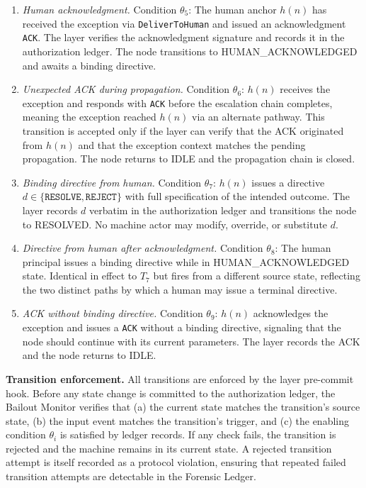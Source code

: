 \begin{enumerate}
\item[$T_5$ (ESCALATING $\rightarrow$ HUMAN\_ACKNOWLEDGED).] \emph{Human acknowledgment.} Condition $\theta_5$: The human anchor $h(n)$ has received the exception via \texttt{DeliverToHuman} and issued an acknowledgment \texttt{ACK}. The \fact{} layer verifies the acknowledgment signature and records it in the authorization ledger. The node transitions to HUMAN\_ACKNOWLEDGED and awaits a binding directive.

\item[$T_6$ (ESCALATING $\rightarrow$ IDLE).] \emph{Unexpected ACK during propagation.} Condition $\theta_6$: $h(n)$ receives the exception and responds with \texttt{ACK} before the escalation chain completes, meaning the exception reached $h(n)$ via an alternate pathway. This transition is accepted only if the \fact{} layer can verify that the ACK originated from $h(n)$ and that the exception context matches the pending propagation. The node returns to IDLE and the propagation chain is closed.

\item[$T_7$ (ESCALATING $\rightarrow$ RESOLVED).] \emph{Binding directive from human.} Condition $\theta_7$: $h(n)$ issues a directive $d \in \{\texttt{RESOLVE}, \texttt{REJECT}\}$ with full specification of the intended outcome. The \fact{} layer records $d$ verbatim in the authorization ledger and transitions the node to RESOLVED. No machine actor may modify, override, or substitute $d$.

\item[$T_8$ (HUMAN\_ACKNOWLEDGED $\rightarrow$ RESOLVED).] \emph{Directive from human after acknowledgment.} Condition $\theta_8$: The human principal issues a binding directive while in HUMAN\_ACKNOWLEDGED state. Identical in effect to $T_7$ but fires from a different source state, reflecting the two distinct paths by which a human may issue a terminal directive.

\item[$T_9$ (HUMAN\_ACKNOWLEDGED $\rightarrow$ IDLE).] \emph{ACK without binding directive.} Condition $\theta_9$: $h(n)$ acknowledges the exception and issues a \texttt{ACK} without a binding directive, signaling that the node should continue with its current parameters. The \fact{} layer records the ACK and the node returns to IDLE.
\end{enumerate}

\bigskip
\noindent\textbf{Transition enforcement.} All transitions are enforced by the \fact{} layer pre-commit hook. Before any state change is committed to the authorization ledger, the Bailout Monitor verifies that (a) the current state matches the transition's source state, (b) the input event matches the transition's trigger, and (c) the enabling condition $\theta_i$ is satisfied by ledger records. If any check fails, the transition is rejected and the machine remains in its current state. A rejected transition attempt is itself recorded as a protocol violation, ensuring that repeated failed transition attempts are detectable in the Forensic Ledger.

